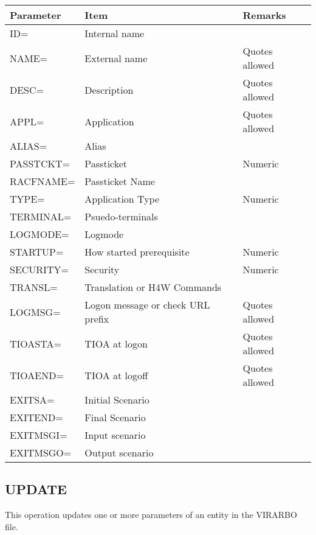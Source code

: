 \documentclass[letterpaper,10pt,english]{sphinxmanual}
\begin{document}
\begin{savenotes}\sphinxattablestart
\centering
\begin{tabulary}{\linewidth}[t]{|T|T|T|}
\hline
\sphinxstyletheadfamily 
Parameter
&\sphinxstyletheadfamily 
Item
&\sphinxstyletheadfamily 
Remarks
\\
\hline
ID=
&
Internal name
&\\
\hline
NAME=
&
External name
&
Quotes allowed
\\
\hline
DESC=
&
Description
&
Quotes allowed
\\
\hline
APPL=
&
Application
&
Quotes allowed
\\
\hline
ALIAS=
&
Alias
&\\
\hline
PASSTCKT=
&
Passticket
&
Numeric
\\
\hline
RACFNAME=
&
Passticket Name
&\\
\hline
TYPE=
&
Application Type
&
Numeric
\\
\hline
TERMINAL=
&
Psuedo-terminals
&\\
\hline
LOGMODE=
&
Logmode
&\\
\hline
STARTUP=
&
How started
prerequisite
&
Numeric
\\
\hline
SECURITY=
&
Security
&
Numeric
\\
\hline
TRANSL=
&
Translation or H4W
Commands
&\\
\hline
LOGMSG=
&
Logon message or
check URL prefix
&
Quotes allowed
\\
\hline
TIOASTA=
&
TIOA at logon
&
Quotes allowed
\\
\hline
TIOAEND=
&
TIOA at logoff
&
Quotes allowed
\\
\hline
EXITSA=
&
Initial Scenario
&\\
\hline
EXITEND=
&
Final Scenario
&\\
\hline
EXITMSGI=
&
Input scenario
&\\
\hline
EXITMSGO=
&
Output scenario
&\\
\hline
\end{tabulary}
\par
\sphinxattableend\end{savenotes}

\ignorespaces 

\subsection{UPDATE}
\label{\detokenize{Installation_Guide:update}}\label{\detokenize{Installation_Guide:index-176}}
This operation updates one or more parameters of an entity in the VIRARBO file.
\end{document}
